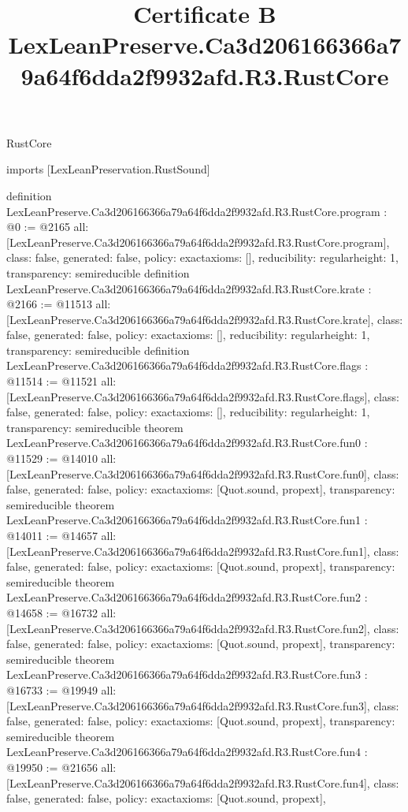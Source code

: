 \begin{lexlean}{RustCore}
\title{Certificate B LexLeanPreserve.Ca3d206166366a79a64f6dda2f9932afd.R3.RustCore}
\begin{coremodule}
imports [LexLeanPreservation.RustSound]

definition LexLeanPreserve.Ca3d206166366a79a64f6dda2f9932afd.R3.RustCore.program : @0 := @2165 {
  all: [LexLeanPreserve.Ca3d206166366a79a64f6dda2f9932afd.R3.RustCore.program],
  class: false,
  generated: false,
  policy: exact{axioms: []},
  reducibility: regular{height: 1},
  transparency: semireducible
}
definition LexLeanPreserve.Ca3d206166366a79a64f6dda2f9932afd.R3.RustCore.krate : @2166 := @11513 {
  all: [LexLeanPreserve.Ca3d206166366a79a64f6dda2f9932afd.R3.RustCore.krate],
  class: false,
  generated: false,
  policy: exact{axioms: []},
  reducibility: regular{height: 1},
  transparency: semireducible
}
definition LexLeanPreserve.Ca3d206166366a79a64f6dda2f9932afd.R3.RustCore.flags : @11514 := @11521 {
  all: [LexLeanPreserve.Ca3d206166366a79a64f6dda2f9932afd.R3.RustCore.flags],
  class: false,
  generated: false,
  policy: exact{axioms: []},
  reducibility: regular{height: 1},
  transparency: semireducible
}
theorem LexLeanPreserve.Ca3d206166366a79a64f6dda2f9932afd.R3.RustCore.fun0 : @11529 := @14010 {
  all: [LexLeanPreserve.Ca3d206166366a79a64f6dda2f9932afd.R3.RustCore.fun0],
  class: false,
  generated: false,
  policy: exact{axioms: [Quot.sound, propext]},
  transparency: semireducible
}
theorem LexLeanPreserve.Ca3d206166366a79a64f6dda2f9932afd.R3.RustCore.fun1 : @14011 := @14657 {
  all: [LexLeanPreserve.Ca3d206166366a79a64f6dda2f9932afd.R3.RustCore.fun1],
  class: false,
  generated: false,
  policy: exact{axioms: [Quot.sound, propext]},
  transparency: semireducible
}
theorem LexLeanPreserve.Ca3d206166366a79a64f6dda2f9932afd.R3.RustCore.fun2 : @14658 := @16732 {
  all: [LexLeanPreserve.Ca3d206166366a79a64f6dda2f9932afd.R3.RustCore.fun2],
  class: false,
  generated: false,
  policy: exact{axioms: [Quot.sound, propext]},
  transparency: semireducible
}
theorem LexLeanPreserve.Ca3d206166366a79a64f6dda2f9932afd.R3.RustCore.fun3 : @16733 := @19949 {
  all: [LexLeanPreserve.Ca3d206166366a79a64f6dda2f9932afd.R3.RustCore.fun3],
  class: false,
  generated: false,
  policy: exact{axioms: [Quot.sound, propext]},
  transparency: semireducible
}
theorem LexLeanPreserve.Ca3d206166366a79a64f6dda2f9932afd.R3.RustCore.fun4 : @19950 := @21656 {
  all: [LexLeanPreserve.Ca3d206166366a79a64f6dda2f9932afd.R3.RustCore.fun4],
  class: false,
  generated: false,
  policy: exact{axioms: [Quot.sound, propext]},
}
\end{coremodule}
\end{lexlean}
